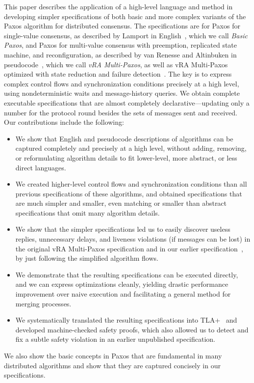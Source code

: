 \documentclass[11pt]{article}
\newcommand{\defn}[1]{\textit{#1}} %
\newcommand{\notes}[1]{} %
\begin{document}
This paper describes the application of a high-level language and method in
developing simpler specifications of both basic and more complex variants
of the Paxos algorithm for distributed consensus.
The specifications are for Paxos for single-value consensus, as described
by Lamport in English~\cite{lam01paxos}, which we call \defn{Basic Paxos},
and Paxos for multi-value consensus with preemption, replicated state
machine, and reconfiguration, as described by van Renesse and Altinbuken in
pseudocode~\cite{vra15paxos}, which we call \defn{vRA Multi-Paxos}, as well
as vRA Multi-Paxos optimized with state reduction and failure
detection~\cite{vra15paxos}.  The key is to express complex control flows
and synchronization conditions precisely at a high level, using
nondeterministic waits and message-history queries.  We obtain complete
executable specifications that are almost completely declarative---updating
only a number for the protocol round besides the sets of messages sent and
received.
Our contributions include the following:
\lipics{}
\begin{itemize}
  \arxiv{\setlength{\itemsep}{0ex}}

\item We show that English and pseudocode descriptions of algorithms
  can be captured completely and precisely at a high level,
  without adding, removing, or reformulating algorithm details to fit
  lower-level, more abstract, or less direct languages.

\item We created higher-level control flows and synchronization conditions
  than all previous specifications of these algorithms, and obtained
  specifications that are much simpler and smaller,
  even matching or smaller than abstract specifications that omit many
  algorithm details.

\item We show that the simpler specifications led us to easily discover
  useless replies, unnecessary delays, and liveness violations (if messages
  can be lost) in the original vRA Multi-Paxos specification and in our
  earlier specification~\cite{Liu+12DistSpec-SSS}, by just following the
  simplified algorithm flows.

\item We demonstrate that the resulting specifications can be executed
  directly, and we can express optimizations cleanly,
  yielding drastic performance improvement over naive execution
  and facilitating a general method for merging processes.

\notes{}

\item We %
systematically translated the resulting specifications into\ppdp{}
TLA+~\cite{Lam02book} and developed
machine-checked safety proofs, 
which also allowed us to detect and fix a subtle safety violation in an
earlier unpublished specification.
\end{itemize}
We also show the basic concepts in Paxos that are fundamental in many
distributed algorithms and show that they are captured concisely in our
specifications.
\end{document}
